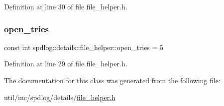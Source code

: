 Definition at line 30 of file file\+\_\+helper.\+h.

\mbox{\label{classspdlog_1_1details_1_1file__helper_a22be952a421d866566eed3a5ce201144}} 
\subsubsection{\texorpdfstring{open\+\_\+tries}{open\_tries}}
{\footnotesize\ttfamily const int spdlog\+::details\+::file\+\_\+helper\+::open\+\_\+tries = 5}



Definition at line 29 of file file\+\_\+helper.\+h.



The documentation for this class was generated from the following file\+:\begin{DoxyCompactItemize}
\item 
util/inc/spdlog/details/\hyperlink{file__helper_8h}{file\+\_\+helper.\+h}\end{DoxyCompactItemize}
